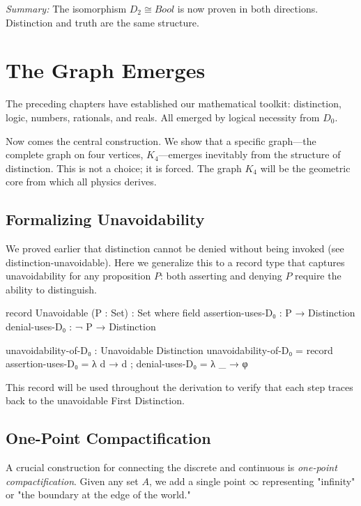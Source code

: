 \documentclass[11pt,a4paper]{book}
\def\texttt#1{#1}%
\def\text#1{#1}%
\begin{document}
\medskip
\noindent\textit{Summary:} The isomorphism $D_2 \cong \text{Bool}$ is now proven in both 
directions. Distinction and truth are the same structure.

\chapter{The Graph Emerges}
\label{chap:graph-emerges}

The preceding chapters have established our mathematical toolkit: distinction, logic, 
numbers, rationals, and reals. All emerged by logical necessity from $D_0$.

Now comes the central construction. We show that a specific graph—the complete graph on 
four vertices, $K_4$—emerges inevitably from the structure of distinction. This is not a 
choice; it is forced. The graph $K_4$ will be the geometric core from which all physics 
derives.

\section{Formalizing Unavoidability}

We proved earlier that distinction cannot be denied without being invoked 
(see \texttt{distinction-unavoidable}). Here we generalize this to a record 
type that captures unavoidability for any proposition $P$: both asserting 
and denying $P$ require the ability to distinguish.

\begin{code}
record Unavoidable (P : Set) : Set where
  field
    assertion-uses-D₀ : P → Distinction
    denial-uses-D₀    : ¬ P → Distinction

unavoidability-of-D₀ : Unavoidable Distinction
unavoidability-of-D₀ = record
  { assertion-uses-D₀ = λ d → d
  ; denial-uses-D₀    = λ _ → φ
  }
\end{code}

This record will be used throughout the derivation to verify that each step 
traces back to the unavoidable First Distinction.

\section{One-Point Compactification}

A crucial construction for connecting the discrete and continuous is 
\emph{one-point compactification}. Given any set $A$, we add a single 
point $\infty$ representing "infinity" or "the boundary at the edge of 
the world."
\end{document}
